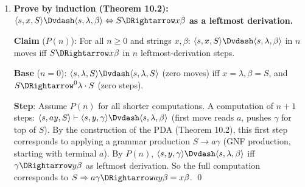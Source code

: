 \begin{enumerate}[{10.}1. ]
\begin{enumerate}
\item \textbf{DPDA}: Yes. The DPDA deterministically pushes $A$s, then pops $A$s, then pushes $B$s, then pops $B$s. Each step is deterministic.

\item \textbf{Counting automaton}: Yes. A single stack symbol suffices: use it first to count the $\pmb{a}$'s against the $\pmb{b}$'s and, after the stack returns to $Z$, reuse the same symbol to count the $\pmb{c}$'s against the $\pmb{d}$'s.

\item \textbf{Grammar from PDA} (Definition 10.7): After applying Definition 10.7 to part (b) and deleting useless variables, we get the equivalent grammar
\[
S\rightarrow AB,\qquad
A\rightarrow \pmb{a}A\pmb{b}\mid \lambda,\qquad
B\rightarrow \pmb{c}B\pmb{d}\mid \lambda.
\]
Here $A$ generates the first balanced block
$\pmb{a}^n\pmb{b}^n$, $B$ generates the second balanced block
$\pmb{c}^m\pmb{d}^m$, and $S$ concatenates those two independent pieces.
\end{enumerate}

\item \textbf{Prove by induction (Theorem 10.2): $\langle s,x,S\rangle\Dvdash\langle s,\lambda,\beta\rangle \Leftrightarrow S\DRightarrow x\beta$ as a leftmost derivation.}

\textbf{Claim} ($P(n)$): For all $n\geq 0$ and strings $x,\beta$: $\langle s,x,S\rangle\Dvdash\langle s,\lambda,\beta\rangle$ in $n$ moves iff $S\DRightarrow x\beta$ in $n$ leftmost-derivation steps.

\textbf{Base} ($n=0$): $\langle s,\lambda,S\rangle\Dvdash\langle s,\lambda,S\rangle$ (zero moves) iff $x=\lambda, \beta=S$, and $S\DRightarrow^0 \lambda\cdot S$ (zero steps). \checkmark

\textbf{Step}: Assume $P(n)$ for all shorter computations. A computation of $n+1$ steps:
$\langle s,ay,S\rangle\vdash\langle s,y,\gamma\rangle\Dvdash\langle s,\lambda,\beta\rangle$ (first move reads $a$, pushes $\gamma$ for top of $S$).
By the construction of the PDA (Theorem 10.2), this first step corresponds to applying a grammar production $S \to a\gamma$ (GNF production, starting with terminal $a$). By $P(n)$, $\langle s,y,\gamma\rangle\Dvdash\langle s,\lambda,\beta\rangle$ iff $\gamma\DRightarrow y\beta$ as leftmost derivation.
So the full computation corresponds to $S \Rightarrow a\gamma \DRightarrow ay\beta = x\beta$. \qed


\end{enumerate}
